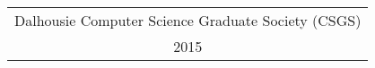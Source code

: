 \documentclass[]{report}
\begin{document}
%
%	
%	

\clearpage
\centering
\begin{titlepage}

	\begin{table}[t]
	\renewcommand{\arraystretch}{1.3}
	\centering
	\begin{tabular}{c}
		Dalhousie Computer Science Graduate Society (CSGS)\\2015
	\end{tabular}
	\end{table}

\end{titlepage}
\end{document}

